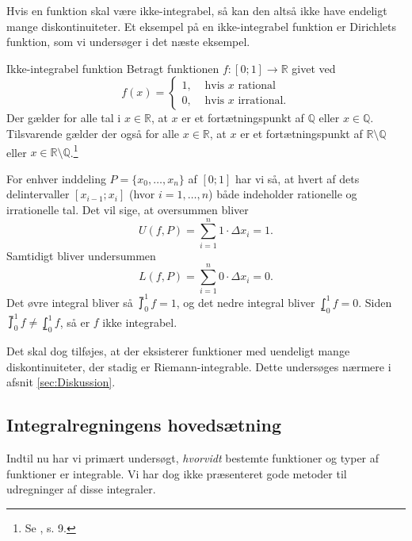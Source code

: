 Hvis en funktion skal være ikke-integrabel, så kan den altså ikke have endeligt mange diskontinuiteter.
Et eksempel på en ikke-integrabel funktion er Dirichlets funktion, som vi undersøger i det næste eksempel.

\begin{example}[label=exa:ikke-integrabel]{Ikke-integrabel funktion}{}
  Betragt funktionen $f:[0;1] \to \mathbb{R}$ givet ved
  \[
  f(x)= 
  \begin{cases}
    1, &\text{ hvis } x \text{ rational }\\
    0, &\text{ hvis } x \text{ irrational.}
  \end{cases}
  \] 
Der gælder for alle tal i $x \in \mathbb{R}$, at $x$ er et fortætningspunkt af $\mathbb{Q}$ eller $x \in \mathbb{Q}$. 
  Tilsvarende gælder der også for alle $x \in \mathbb{R}$, at $x$ er et fortætningspunkt af $\mathbb{R} \setminus \mathbb{Q}$ eller $x \in \mathbb{R} \setminus \mathbb{Q}$.\footnote{Se \cite{Rudin1976}, s. 9.}

  For enhver inddeling $P=\{ x_0, \ldots , x_n \}$ af $[0;1]$ har vi så, at hvert af dets delintervaller $[x _{i-1};x_i]$ (hvor $i=1,\ldots , n$) både indeholder rationelle og irrationelle tal. 
  Det vil sige, at oversummen bliver
  \[
  U(f, P)=\sum_{i  =1}^{n} 1 \cdot \Delta x_i =1. 
  \] 
  Samtidigt bliver undersummen
\[
  L(f ,P)=\sum_{i =1}^{n} 0 \cdot \Delta x_i =0.
\] 
  Det øvre integral bliver så $\upint_{0}^{1} f =1$, og det nedre integral bliver $\lowint_{0}^{1} f =0 $.
  Siden $\upint_{0}^{1} f \neq \lowint_{0}^{1} f$, så er $f$ ikke integrabel. 
\end{example}

Det skal dog tilføjes, at der eksisterer funktioner med uendeligt mange diskontinuiteter, der stadig er Riemann-integrable.
Dette undersøges nærmere i afsnit \ref{sec:Diskussion}.

\subsection{Integralregningens hovedsætning}%
\label{sub:Integralregningens hovedsætning}
Indtil nu har vi primært undersøgt, \textit{hvorvidt} bestemte funktioner og typer af funktioner er integrable.
Vi har dog ikke præsenteret gode metoder til udregninger af disse integraler.


